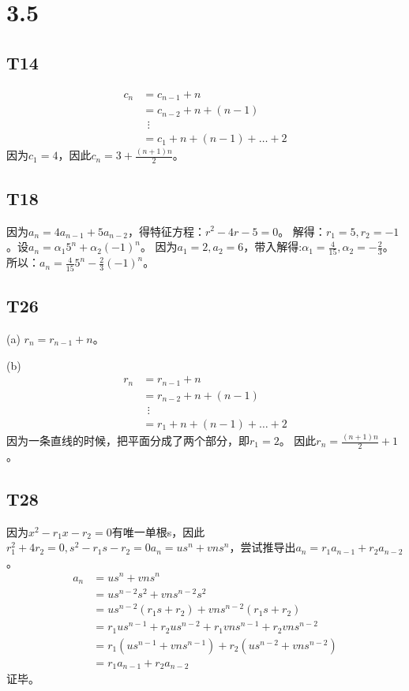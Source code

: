 \documentclass{article}
\begin{document}
\section{3.5}
\subsection{T14}
\begin{align*}
    c_n &= c_{n - 1} + n\\
    &= c_{n-2} + n + (n - 1)\\
    &\ \ \vdots\\
    &= c_1 + n + (n - 1) + \dots + 2
\end{align*}
因为$c_1 = 4$，因此$c_n = 3 + \frac{(n + 1)n}{2}$。
\subsection{T18}
因为$a_n = 4a_{n-1} + 5 a_{n -2}$，得特征方程：$r^2 - 4r - 5 = 0$。
解得：$r_1 = 5, r_2 = -1$。设$a_n = \alpha_1 5^n + \alpha_2 (-1)^n$。
因为$a_1 = 2, a_2 = 6$，带入解得:$\alpha_1 = \frac{4}{15}, \alpha_2 = -\frac{2}{3}$。
所以：$a_n = \frac{4}{15}5^n - \frac{2}{3}(-1)^n$。
\subsection{T26}
(a) $r_n = r_{n - 1} + n$。

(b)\begin{align*}
    r_n &= r_{n - 1} + n\\
    &= r_{n - 2} + n + (n - 1)\\
    &\ \ \vdots\\
    &= r_1 + n + (n - 1) + \dots + 2 
\end{align*}
因为一条直线的时候，把平面分成了两个部分，即$r_1 = 2$。
因此$r_n = \frac{(n + 1)n}{2} + 1$。
\subsection{T28}
因为$x^2 - r_1x - r_2 = 0$有唯一单根s，因此$r_1^2 + 4r_2 = 0, s^2 - r_1s - r_2 = 0
a_n = us^n + vns^n$，尝试推导出$a_n = r_1a_{n - 1} + r_2a_{n-2}$。
\begin{align*}
    a_n &= us^n + vns^n\\
    &= us^{n - 2}s^2 + vns^{n - 2}s^2\\
    &= us^{n - 2}(r_1s + r_2) + vns^{n - 2}(r_1s + r_2)\\
    &= r_1us^{n - 1} + r_2us^{n - 2} + r_1vns^{n - 1} + r_2vns^{n - 2}\\
    &= r_1(us^{n - 1} + vns^{n - 1}) + r_2(us^{n - 2} + vns^{n - 2})\\
    &= r_1a_{n - 1} + r_2a_{n - 2}
\end{align*}
证毕。
\end{document}
